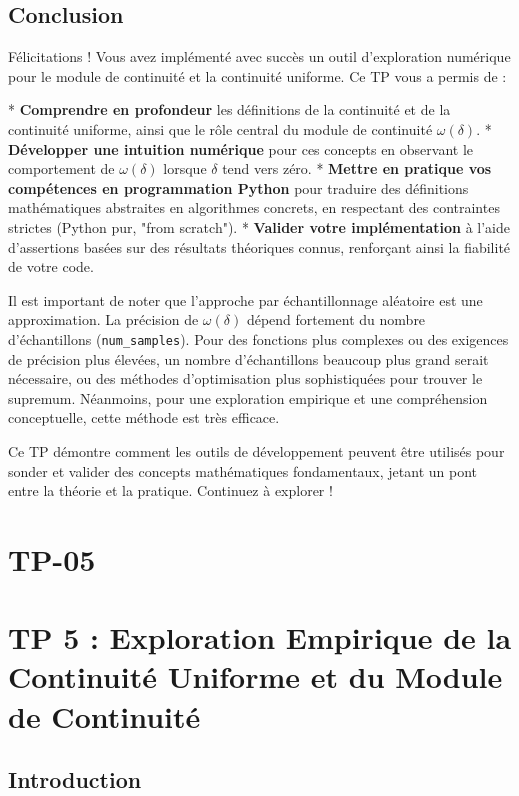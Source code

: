 \documentclass[12pt,a4paper]{report}
\begin{document}
\subsection{Conclusion}

Félicitations ! Vous avez implémenté avec succès un outil d'exploration numérique pour le module de continuité et la continuité uniforme. Ce TP vous a permis de :

*   \textbf{Comprendre en profondeur} les définitions de la continuité et de la continuité uniforme, ainsi que le rôle central du module de continuité $\omega(\delta)$.
*   \textbf{Développer une intuition numérique} pour ces concepts en observant le comportement de $\omega(\delta)$ lorsque $\delta$ tend vers zéro.
*   \textbf{Mettre en pratique vos compétences en programmation Python} pour traduire des définitions mathématiques abstraites en algorithmes concrets, en respectant des contraintes strictes (Python pur, "from scratch").
*   \textbf{Valider votre implémentation} à l'aide d'assertions basées sur des résultats théoriques connus, renforçant ainsi la fiabilité de votre code.

Il est important de noter que l'approche par échantillonnage aléatoire est une approximation. La précision de $\omega(\delta)$ dépend fortement du nombre d'échantillons (\texttt{num\_samples}). Pour des fonctions plus complexes ou des exigences de précision plus élevées, un nombre d'échantillons beaucoup plus grand serait nécessaire, ou des méthodes d'optimisation plus sophistiquées pour trouver le supremum. Néanmoins, pour une exploration empirique et une compréhension conceptuelle, cette méthode est très efficace.

Ce TP démontre comment les outils de développement peuvent être utilisés pour sonder et valider des concepts mathématiques fondamentaux, jetant un pont entre la théorie et la pratique. Continuez à explorer !

\section{TP-05}
\section{TP 5 : Exploration Empirique de la Continuité Uniforme et du Module de Continuité}

\subsection{Introduction}
\end{document}
